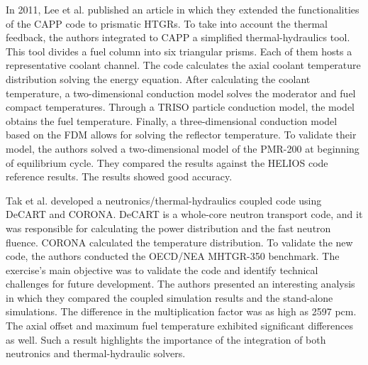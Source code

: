 In 2011, Lee et al. published an article \cite{lee_development_2011} in which they extended the functionalities of the CAPP code to prismatic \glspl{HTGR}.
To take into account the thermal feedback, the authors integrated to CAPP a simplified thermal-hydraulics tool.
This tool divides a fuel column into six triangular prisms.
Each of them hosts a representative coolant channel.
The code calculates the axial coolant temperature distribution solving the energy equation.
After calculating the coolant temperature, a two-dimensional conduction model solves the moderator and fuel compact temperatures.
Through a TRISO particle conduction model, the model obtains the fuel temperature.
Finally, a three-dimensional conduction model based on the \gls{FDM} allows for solving the reflector temperature.
To validate their model, the authors solved a two-dimensional model of the PMR-200 at beginning of equilibrium cycle.
They compared the results against the HELIOS code reference results.
The results showed good accuracy.

Tak et al. \cite{tak_coupled_2016} developed a neutronics/thermal-hydraulics coupled code using DeCART \cite{kaeri_decart_2007} and CORONA.
DeCART is a whole-core neutron transport code, and it was responsible for calculating the power distribution and the fast neutron fluence.
CORONA calculated the temperature distribution.
To validate the new code, the authors conducted the OECD/NEA MHTGR-350 benchmark.
The exercise's main objective was to validate the code and identify technical challenges for future development.
The authors presented an interesting analysis in which they compared the coupled simulation results and the stand-alone simulations.
The difference in the multiplication factor was as high as 2597 pcm.
The axial offset and maximum fuel temperature exhibited significant differences as well.
Such a result highlights the importance of the integration of both neutronics and thermal-hydraulic solvers.

